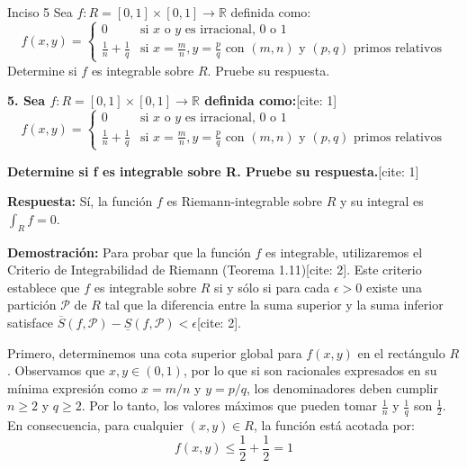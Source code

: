 \documentclass[11pt,letterpaper]{article}
\begin{document}
\begin{inciso}{Inciso 5}
Sea $f:R=[0,1]\times[0,1]\rightarrow\mathbb{R}$ definida como:
\begin{equation*}
    f(x,y)=\begin{cases}
        0 & \text{si } x \text{ o } y \text{ es irracional, } 0 \text{ o } 1\\ 
        \frac{1}{n}+\frac{1}{q} & \text{si } x=\frac{m}{n}, y=\frac{p}{q} \text{ con } (m,n) \text{ y } (p,q) \text{ primos relativos}
    \end{cases}
\end{equation*}
Determine si $f$ es integrable sobre $R$. Pruebe su respuesta.
\end{inciso}

\textbf{5. Sea $f:R=[0,1]\times[0,1]\rightarrow\mathbb{R}$ definida como:}[cite: 1]
\begin{equation*}
f(x,y)=\begin{cases}0&\text{si } x \text{ o } y \text{ es irracional, } 0 \text{ o } 1\\ \frac{1}{n}+\frac{1}{q}&\text{si } x=\frac{m}{n},y=\frac{p}{q} \text{ con } (m,n) \text{ y } (p,q) \text{ primos relativos}\end{cases}
\end{equation*}

\textbf{Determine si f es integrable sobre R. Pruebe su respuesta.}[cite: 1]

\vspace{0.5cm}

\textbf{Respuesta:}
Sí, la función $f$ es Riemann-integrable sobre $R$ y su integral es $\int_{R} f = 0$.

\textbf{Demostración:}
Para probar que la función $f$ es integrable, utilizaremos el Criterio de Integrabilidad de Riemann (Teorema 1.11)[cite: 2]. Este criterio establece que $f$ es integrable sobre $R$ si y sólo si para cada $\epsilon > 0$ existe una partición $\mathcal{P}$ de $R$ tal que la diferencia entre la suma superior y la suma inferior satisface $\overline{S}(f,\mathcal{P}) - \underline{S}(f,\mathcal{P}) < \epsilon$[cite: 2].

Primero, determinemos una cota superior global para $f(x,y)$ en el rectángulo $R$. Observamos que $x, y \in (0,1)$, por lo que si son racionales expresados en su mínima expresión como $x=m/n$ y $y=p/q$, los denominadores deben cumplir $n \ge 2$ y $q \ge 2$. Por lo tanto, los valores máximos que pueden tomar $\frac{1}{n}$ y $\frac{1}{q}$ son $\frac{1}{2}$. En consecuencia, para cualquier $(x,y) \in R$, la función está acotada por:
\begin{equation*}
f(x,y) \le \frac{1}{2} + \frac{1}{2} = 1
\end{equation*}
\end{document}
